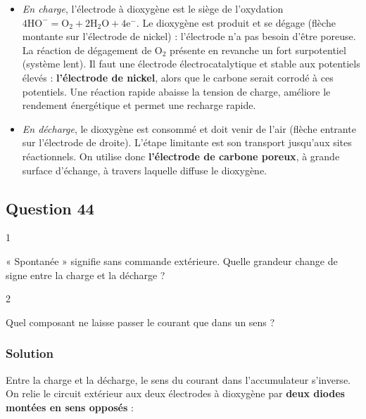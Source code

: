 \documentclass[11pt,a4paper]{article}
\providecommand{\tightlist}{\setlength{\itemsep}{0pt}\setlength{\parskip}{0pt}}
\begin{document}
\begin{itemize}
\tightlist
\item
  \emph{En charge}, l'électrode à dioxygène est le siège de l'oxydation \(4\mathrm{HO^-}=\mathrm{O_2}+2\mathrm{H_2O}+4\mathrm{e^-}\). Le dioxygène est produit et se dégage (flèche montante sur l'électrode de nickel) : l'électrode n'a pas besoin d'être poreuse. La réaction de dégagement de \(\mathrm{O_2}\) présente en revanche un fort surpotentiel (système lent). Il faut une électrode électrocatalytique et stable aux potentiels élevés : \textbf{l'électrode de nickel}, alors que le carbone serait corrodé à ces potentiels. Une réaction rapide abaisse la tension de charge, améliore le rendement énergétique et permet une recharge rapide.
\item
  \emph{En décharge}, le dioxygène est consommé et doit venir de l'air (flèche entrante sur l'électrode de droite). L'étape limitante est son transport jusqu'aux sites réactionnels. On utilise donc \textbf{l'électrode de carbone poreux}, à grande surface d'échange, à travers laquelle diffuse le dioxygène.
\end{itemize}

\hypertarget{question-44}{%
\subsection{Question 44}\label{question-44}}

\begin{indication}{1}

« Spontanée » signifie sans commande extérieure. Quelle grandeur change de signe entre la charge et la décharge ?

\end{indication}

\begin{indication}{2}

Quel composant ne laisse passer le courant que dans un sens ?

\end{indication}

\hypertarget{solution-43}{%
\subsubsection{Solution}\label{solution-43}}

Entre la charge et la décharge, le sens du courant dans l'accumulateur s'inverse. On relie le circuit extérieur aux deux électrodes à dioxygène par \textbf{deux diodes montées en sens opposés} :
\end{document}
